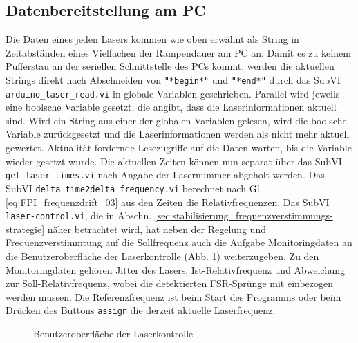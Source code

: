 \subsection{Datenbereitstellung am PC}\label{subsec:datenbereitstellung}
Die Daten eines jeden Lasers kommen wie oben erwähnt als String in Zeitabständen
eines Vielfachen der Rampendauer am PC an. Damit es zu keinem Pufferstau an
der seriellen Schnittstelle des PCs kommt, werden die aktuellen Strings direkt
nach Abschneiden von \lstinline|"*begin*"| und \lstinline|"*end*"| durch das
SubVI \lstinline|arduino_laser_read.vi| in globale Variablen geschrieben.
Parallel wird jeweils eine boolsche Variable gesetzt, die angibt, dass die Laserinformationen aktuell sind. Wird ein String aus einer der
globalen Variablen gelesen, wird die boolsche Variable zurückgesetzt und die
Laserinformationen werden als nicht mehr aktuell gewertet. Aktualität fordernde
Lesezugriffe auf die Daten warten, bis die Variable wieder gesetzt wurde. Die
aktuellen Zeiten können nun separat über das SubVI
\lstinline|get_laser_times.vi| nach Angabe der Lasernummer abgeholt werden. Das SubVI \lstinline|delta_time2delta_frequency.vi| berechnet nach Gl. \eqref{eq:FPI_frequenzdrift_03} aus den Zeiten die
Relativfrequenzen. Das SubVI \lstinline|laser-control.vi|, die in Abschn. \ref{sec:stabilisierung_frequenzverstimmungs-strategie} näher betrachtet wird, hat neben
der Regelung und Frequenzverstimmtung auf die Sollfrequenz auch die Aufgabe
Monitoringdaten an die Benutzeroberfläche der Laserkontrolle (Abb.
\ref{fig:benutzeroberflaeche_laserkontrolle}) weiterzugeben. Zu den
Monitoringdaten gehören Jitter des Lasers, Ist-Relativfrequenz und Abweichung
zur Soll-Relativfrequenz, wobei die detektierten FSR-Sprünge mit einbezogen
werden müssen. Die Referenzfrequenz ist beim Start des Programms oder beim
Drücken des Buttons \lstinline|assign| die derzeit aktuelle Laserfrequenz.
\begin{figure}[hp]
 	\centering
	\caption[Benutzeroberfläche -
	Laserkontrolle]{Benutzeroberfläche
	der Laserkontrolle}\label{fig:benutzeroberflaeche_laserkontrolle}
\end{figure}

